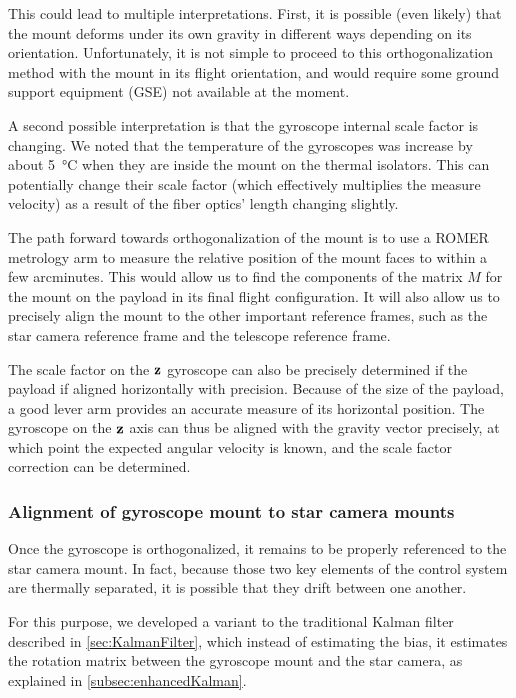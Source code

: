 This could lead to multiple interpretations. First, it is possible (even likely) that the mount deforms under its own gravity in different ways depending on its orientation. Unfortunately, it is not simple to proceed to this orthogonalization method with the mount in its flight orientation, and would require some ground support equipment (GSE) not available at the moment. 

A second possible interpretation is that the gyroscope internal scale factor is changing. We noted that the temperature of the gyroscopes was increase by about \SI{5}{\degreeCelsius} when they are inside the mount on the thermal isolators. This can potentially change their scale factor (which effectively multiplies the measure velocity) as a result of the fiber optics' length changing slightly. 

The path forward towards orthogonalization of the mount is to use a ROMER metrology arm to measure the relative position of the mount faces to within a few arcminutes. This would allow us to find the components of the matrix $M$ for the mount on the payload in its final flight configuration. It will also allow us to precisely align the mount to the other important reference frames, such as the star camera reference frame and the telescope reference frame.

The scale factor on the $\textrm{\textbf{z}}$ gyroscope can also be precisely determined if the payload if aligned horizontally with precision. Because of the size of the payload, a good lever arm provides an accurate measure of its horizontal position. The gyroscope on the $\textrm{\textbf{z}}$ axis can thus be aligned with the gravity vector precisely, at which point the expected angular velocity is known, and the scale factor correction can be determined.


\subsubsection{Alignment of gyroscope mount to star camera mounts}

Once the gyroscope is orthogonalized, it remains to be properly referenced to the star camera mount. In fact, because those two key elements of the control system are thermally separated, it is possible that they drift between one another. 

For this purpose, we developed a variant to the traditional Kalman filter described in \ref{sec:KalmanFilter}, which instead of estimating the bias, it estimates the rotation matrix between the gyroscope mount and the star camera, as explained in \ref{subsec:enhancedKalman}. 

